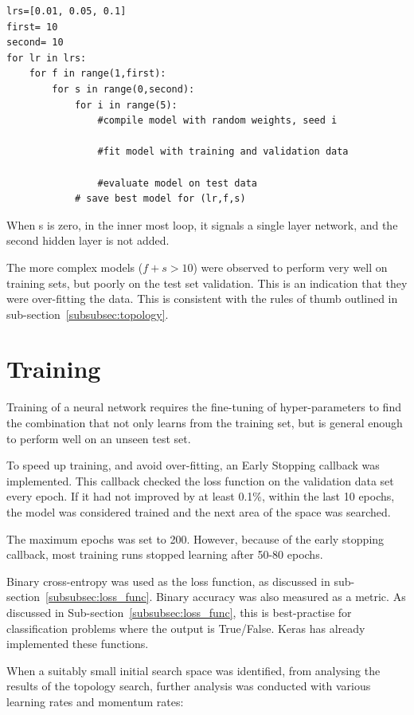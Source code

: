 \begin{lstlisting}[caption={Initial Space Search}, captionpos=t, label={lst:initial_search}]
lrs=[0.01, 0.05, 0.1]
first= 10
second= 10
for lr in lrs:
    for f in range(1,first):
        for s in range(0,second):
            for i in range(5):
                #compile model with random weights, seed i
                
                #fit model with training and validation data
                
                #evaluate model on test data
            # save best model for (lr,f,s)
\end{lstlisting}

When s is zero, in the inner most loop, it signals a single layer network, and the second hidden layer is not added.

The more complex models ($f+s > 10$) were observed to perform very well on training sets, but poorly on the test set validation. This is an indication that they were over-fitting the data. This is consistent with the rules of thumb outlined in sub-section~\ref{subsubsec:topology}.

\pagebreak
\section{Training}

Training of a neural network requires the fine-tuning of hyper-parameters to find the combination that not only learns from the training set, but is general enough to perform well on an unseen test set.

To speed up training, and avoid over-fitting, an Early Stopping callback was implemented. This callback checked the loss function on the validation data set every epoch. If it had not improved by at least 0.1\%, within the last 10 epochs, the model was considered trained and the next area of the space was searched.

The maximum epochs was set to 200. However, because of the early stopping callback, most training runs stopped learning after 50-80 epochs.

Binary cross-entropy was used as the loss function, as discussed in sub-section~\ref{subsubsec:loss_func}. Binary accuracy was also measured as a metric. As discussed in Sub-section~\ref{subsubsec:loss_func}, this is best-practise for classification problems where the output is True/False. Keras has already implemented these functions.

When a suitably small initial search space was identified, from analysing the results of the topology search, further analysis was conducted with various learning rates and momentum rates:

